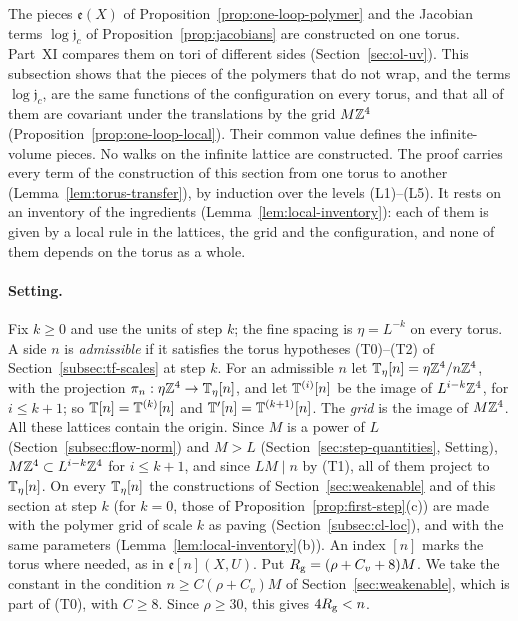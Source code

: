 The pieces $\mathfrak e(X)$ of Proposition~\ref{prop:one-loop-polymer} and the Jacobian terms $\log\mathfrak j_c$ of Proposition~\ref{prop:jacobians} are constructed on one torus. Part~XI compares them on tori of different sides (Section~\ref{sec:ol-uv}). This subsection shows that the pieces of the polymers that do not wrap, and the terms $\log\mathfrak j_c$, are the same functions of the configuration on every torus, and that all of them are covariant under the translations by the grid $M\mathbb Z^4$ (Proposition~\ref{prop:one-loop-local}). Their common value defines the infinite-volume pieces. No walks on the infinite lattice are constructed. The proof carries every term of the construction of this section from one torus to another (Lemma~\ref{lem:torus-transfer}), by induction over the levels (L1)--(L5). It rests on an inventory of the ingredients (Lemma~\ref{lem:local-inventory}): each of them is given by a local rule in the lattices, the grid and the configuration, and none of them depends on the torus as a whole.

\paragraph{Setting.} Fix $k\ge0$ and use the units of step $k$; the fine spacing is $\eta=L^{-k}$ on every torus. A side $n$ is \emph{admissible} if it satisfies the torus hypotheses (T0)--(T2) of Section~\ref{subsec:tf-scales} at step $k$. For an admissible $n$ let $\mathbb T_\eta[n]=\eta\mathbb Z^4/n\mathbb Z^4$, with the projection $\pi_n:\eta\mathbb Z^4\to\mathbb T_\eta[n]$, and let $\mathbb T^{(i)}[n]$ be the image of $L^{i-k}\mathbb Z^4$, for $i\le k+1$; so $\mathbb T[n]=\mathbb T^{(k)}[n]$ and $\mathbb T'[n]=\mathbb T^{(k+1)}[n]$. The \emph{grid} is the image of $M\mathbb Z^4$. All these lattices contain the origin. Since $M$ is a power of $L$ (Section~\ref{subsec:flow-norm}) and $M>L$ (Section~\ref{sec:step-quantities}, Setting), $M\mathbb Z^4\subset L^{i-k}\mathbb Z^4$ for $i\le k+1$, and since $LM\mid n$ by (T1), all of them project to $\mathbb T_\eta[n]$. On every $\mathbb T_\eta[n]$ the constructions of Section~\ref{sec:weakenable} and of this section at step $k$ (for $k=0$, those of Proposition~\ref{prop:first-step}(c)) are made with the polymer grid of scale $k$ as paving (Section~\ref{subsec:cl-loc}), and with the same parameters (Lemma~\ref{lem:local-inventory}(b)). An index $[n]$ marks the torus where needed, as in $\mathfrak e[n](X,U)$. Put $R_{\rm g}=(\rho+C_v+8)M$. We take the constant in the condition $n\ge C(\rho+C_v)M$ of Section~\ref{sec:weakenable}, which is part of (T0), with $C\ge8$. Since $\rho\ge30$, this gives $4R_{\rm g}<n$.

